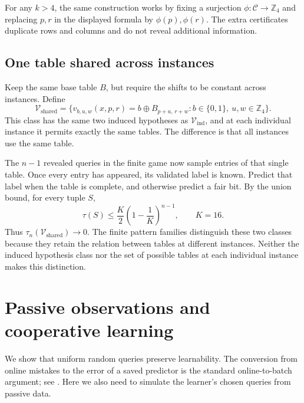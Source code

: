 \documentclass[11pt]{article}
\newcommand{\C}{\mathcal C}
\newcommand{\V}{\mathcal V}
\begin{document}
For any $k>4$, the same construction works by fixing a surjection
$\phi:\C\to\mathbb Z_4$ and replacing $p,r$ in the displayed formula by
$\phi(p),\phi(r)$. The extra certificates duplicate rows and columns and
do not reveal additional information.

\subsection{One table shared across instances}

Keep the same base table $B$, but require the shifts to be constant across
instances. Define
\[
\V_{\mathrm{shared}}=
\{v_{b,u,w}(x,p,r)=b\oplus B_{p+u,\,r+w}:
     b\in\{0,1\},\ u,w\in\mathbb Z_4\}.
\]
This class has the same two induced hypotheses as
$\V_{\mathrm{ind}}$, and at each individual instance it permits exactly
the same tables. The difference is that all instances use the same table.

The $n-1$ revealed queries in the finite game now sample entries of that
single table. Once every entry has appeared, its validated label is known.
Predict that label when the table is complete, and otherwise predict a fair
bit. By the union bound, for every tuple $S$,
\[
\tau(S)\le
\frac{K}{2}\left(1-\frac1K\right)^{n-1},
\qquad K=16.
\]
Thus $\tau_n(\V_{\mathrm{shared}})\to0$. The finite pattern families
distinguish these two classes because they retain the relation between
tables at different instances. Neither the induced hypothesis class nor
the set of possible tables at each individual instance makes this
distinction.

\appendix
\section{Passive observations and cooperative learning}\label{app:passive}

We show that uniform random queries preserve learnability. The conversion
from online mistakes to the error of a saved predictor is the standard
online-to-batch argument; see \citet{cesabianchi2004generalization}. Here we
also need to simulate the learner's chosen queries from passive data.
\end{document}
